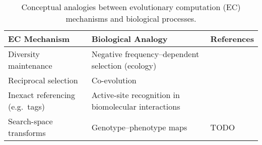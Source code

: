 \begin{table*}
\centering
\caption{Conceptual analogies between evolutionary computation (EC) mechanisms and biological processes.}
\label{tab:bioinspiration}
\renewcommand{\arraystretch}{1.6} %
\begin{tabular}{@{}p{4.2cm}p{4.2cm}p{6.5cm}@{}}
\toprule
\textbf{EC Mechanism} & \textbf{Biological Analogy} & \textbf{References} \\
\midrule
Diversity maintenance & Negative frequency--dependent selection (ecology) & \citep{dolson2018ecological,dolson2018applying} \\
Reciprocal selection & Co-evolution & \citep{lehman2010efficiently,harper2012spatial,garbus2024accelerating,koza1991genetic,kala2012multi,wang2019poet,miikkulainen2024evolving} \\
Inexact referencing (e.g.\ tags) & Active-site recognition in biomolecular interactions & \citep{spector2011tag,moreno2023matchmaker,lalejini2018signalgp,downing2015intelligence} \\
Search-space transforms & Genotype–phenotype maps & \citep{lehman2023evolution,moreno2018learning,bentley2022evolving,gaier2020discovering,wittenberg2023denoising} TODO \\
\bottomrule
\end{tabular}
\end{table*}
